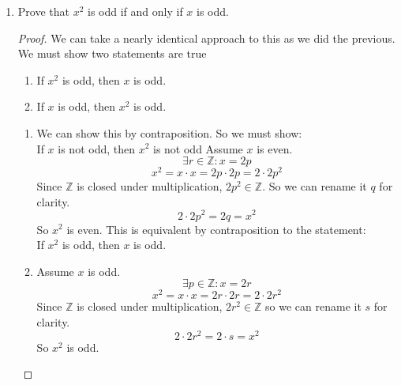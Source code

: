 \documentclass[12pt,letterpaper]{article}
\begin{document}
\begin{enumerate}
\begin{enumerate}
\begin{proof}
                By $i$ and $ii$, we have shown both cases and thus
                $x^2$ is even if and only if $x$ is even. \\

            \end{proof}
        \pagebreak

        \item Prove that $x^2$ is odd if and only if $x$ is odd. \\

            \begin{proof}
                We can take a nearly identical approach to this
                as we did the previous.
                We must show two statements are true
                \begin{enumerate}
                    \item If $x^2$ is odd, then $x$ is odd.
                    \item If $x$ is odd, then $x^2$ is odd.
                \end{enumerate}

                \begin{enumerate}
                    \item
                        We can show this by contraposition.
                        So we must show: \\
                        If $x$ is not odd, then $x^2$ is not odd
                        Assume $x$ is even.
                        \[\exists r \in \mathbb{Z} : x = 2p\]
                        \[
                            x^2 = x \cdot x = 2p \cdot 2p = 2 \cdot 2p^2
                        \]
                        Since $\mathbb{Z}$ is closed under multiplication,
                        $2p^2 \in \mathbb{Z}$.
                        So we can rename it $q$ for clarity.
                        \[2 \cdot 2p^2 = 2q = x^2\]
                        So $x^2$ is even.
                        This is equivalent by contraposition to the statement: \\
                        If $x^2$ is odd, then $x$ is odd.

                    \item
                        Assume $x$ is odd.
                        \[\exists p \in \mathbb{Z} : x = 2r\]
                        \[x^2 = x \cdot x = 2r \cdot 2r = 2 \cdot 2r^2\]
                        Since $\mathbb{Z}$ is closed under multiplication,
                        $2r^2 \in \mathbb{Z}$ so we can rename it $s$ for clarity.
                        \[2 \cdot 2r^2 = 2 \cdot s = x^2\]
                        So $x^2$ is odd.
                \end{enumerate}


\end{proof}
\end{enumerate}
\end{enumerate}
\end{document}
